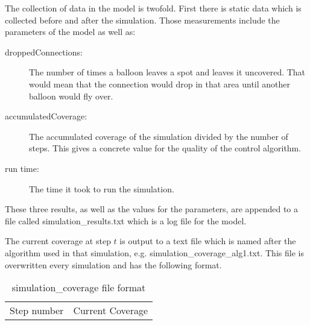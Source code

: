 The collection of data in the model is twofold. First there is static data which is collected before and after the simulation. Those measurements include the parameters of the model as well as: 

\begin{description}
    \item[droppedConnections: ] The number of times a balloon leaves a spot and leaves it uncovered. That would mean that the connection would drop in that area until another balloon would fly over.
    \item[accumulatedCoverage: ] The accumulated coverage of the simulation divided by the number of steps. This gives a concrete value for the quality of the control algorithm.
    \item[run time: ]The time it took to run the simulation.
\end{description}

These three results, as well as the values for the parameters, are appended to a file called simulation\_results.txt which is a log file for the model. 

The current coverage at step $t$ is output to a text file which is named after the algorithm used in that simulation, e.g. simulation\_coverage\_alg1.txt. This file is overwritten every simulation and has the following format.
\begin{table}[]
\centering
\begin{tabular}{l|l}
Step number & Current Coverage
\end{tabular}
\caption{simulation\_coverage file format}
\end{table}